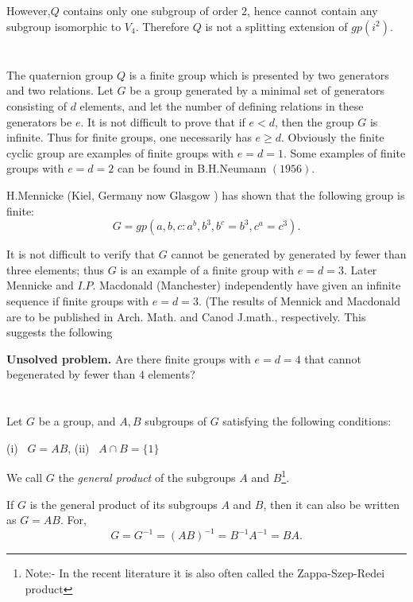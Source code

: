 However,\pageoriginale $Q$ contains only one subgroup of order $2$, hence cannot
contain any subgroup isomorphic to $V_4$. Therefore $Q$ is not a
splitting extension of $gp(i^2)$. 

\section{}\label{chap6:sec3} %

The quaternion group $Q$ is a finite group which is presented by two
generators and two relations.  Let $G$ be a group generated by a
minimal set of generators consisting of $d$ elements, and let  the
number of defining relations in these generators be $e$. It is not
difficult to prove that if $e < d$, then the group $G$ is infinite. Thus
for finite groups, one necessarily has $e \ge d$. Obviously the finite
cyclic group are examples of finite  groups with $e = d=1$. Some
examples of finite groups with $e = d =2$ can be found in B.H.Neumann
$(1956)$. 

H.Mennicke (Kiel, Germany now Glasgow ) has shown that the following
group is finite: 
$$
G= gp \left(a, b, c: a^b, b^3, b^c=b^3, c^a= c^3\right).
$$ 

It is not difficult to verify  that $G$ cannot be generated by
generated by fewer than three elements; thus $G$ is an example of a
finite group with $e= d=3$. Later Mennicke and $I. P$. Macdonald
(Manchester) independently have given an infinite sequence if finite
groups  with $e= d =3$. (The results of Mennick and Macdonald are to
be published in Arch. Math. and Canod J.math., respectively. This
suggests the following 

\noindent \textbf{Unsolved problem. }
  Are there finite groups with $e = d =4$ that cannot be\pageoriginale generated by
  fewer than $4$ elements? 

\section{}\label{chap6:sec4}%

Let $G$ be a group, and $A, B$ subgroups of $G$ satisfying the
following conditions: 

(i)~ $G= AB$,  \qquad (ii)~ $A \cap B = \{ 1\}$

We call $G$ the \textit{general product} of the subgroups  $A$ and
$B$\footnote{Note:- In the recent literature it is also often
  called the Zappa-Szep-Redei product}. 

If $G$ is the general product of its subgroups $A$ and $B$, then it
can also be written as $G=AB$. For, 
$$
G=G^{-1} = (AB)^{-1} = B^{-1}A^{-1} = BA.
$$


